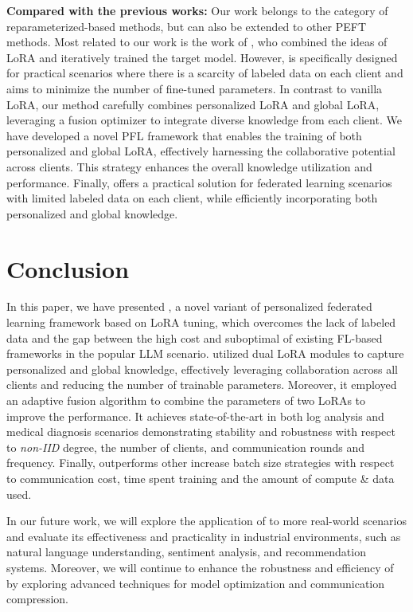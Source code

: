 \documentclass[sigconf]{acmart}
\newcommand\our{\text{FDLoRA}}
\begin{document}
\textbf{Compared with the previous works:} Our work belongs to the category of reparameterized-based methods, but can also be extended to other PEFT methods. Most related to our work is the work of \cite{yi2023fedlora, wu2024fedlora}, who combined the ideas of LoRA and iteratively trained the target model. However, \our{} is specifically designed for practical scenarios where there is a scarcity of labeled data on each client and aims to minimize the number of fine-tuned parameters. In contrast to vanilla LoRA, our method carefully combines personalized LoRA and global LoRA, leveraging a fusion optimizer to integrate diverse knowledge from each client. We have developed a novel PFL framework that enables the training of both personalized and global LoRA, effectively harnessing the collaborative potential across clients. This strategy enhances the overall knowledge utilization and performance. Finally, \our{} offers a practical solution for federated learning scenarios with limited labeled data on each client, while efficiently incorporating both personalized and global knowledge.


\section{Conclusion} \label{sec:conclusion}
In this paper, we have presented \our{}, a novel variant of personalized federated learning framework based on LoRA tuning, which overcomes the lack of labeled data and the gap between the high cost and suboptimal of existing FL-based frameworks in the popular LLM scenario. \our{} utilized dual LoRA modules to capture personalized and global knowledge, effectively leveraging collaboration across all clients and reducing the number of trainable parameters. Moreover, it employed an adaptive fusion algorithm to combine the parameters of two LoRAs to improve the performance. It achieves state-of-the-art in both log analysis and medical diagnosis scenarios demonstrating stability and robustness with respect to \textit{non-IID} degree, the number of clients, and communication rounds and frequency. Finally, \our{} outperforms other increase batch size strategies with respect to communication cost, time spent training and the amount of compute \& data used.
\par
In our future work, we will explore the application of \our{} to more real-world scenarios and evaluate its effectiveness and practicality in industrial environments, such as natural language understanding, sentiment analysis, and recommendation systems. Moreover, we will continue to enhance the robustness and efficiency of \our{} by exploring advanced techniques for model optimization and communication compression.





\end{document}
